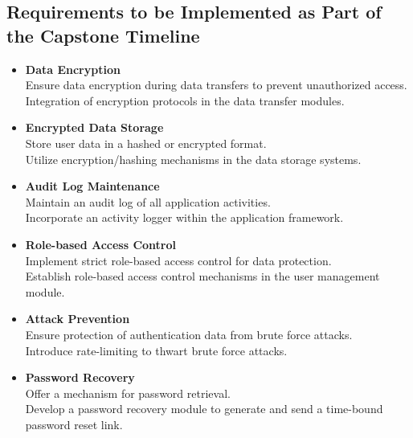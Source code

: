 \documentclass{article}
\newcounter{srnum} %
\newcommand{\rthesrnum}{SR\refstepcounter{srnum}\thesrnum:}
\begin{document}
\subsection{Requirements to be Implemented as Part of the Capstone Timeline}
\begin{itemize}[leftmargin=16.5mm,labelsep=4mm,label=\rthesrnum]
    \item \textbf{Data Encryption} \\
    Ensure data encryption during data transfers to prevent unauthorized access. \\
    Integration of encryption protocols in the data transfer modules. \\
    
    \item \textbf{Encrypted Data Storage} \\
    Store user data in a hashed or encrypted format. \\
    Utilize encryption/hashing mechanisms in the data storage systems. \\
    
    \item \textbf{Audit Log Maintenance} \\
    Maintain an audit log of all application activities. \\
    Incorporate an activity logger within the application framework. \\
    
    \item \textbf{Role-based Access Control} \\
    Implement strict role-based access control for data protection. \\
    Establish role-based access control mechanisms in the user management module. \\
    
    \item \textbf{Attack Prevention} \\
    Ensure protection of authentication data from brute force attacks. \\
    Introduce rate-limiting to thwart brute force attacks. \\
    
    \item \textbf{Password Recovery} \\
    Offer a mechanism for password retrieval. \\
    Develop a password recovery module to generate and send a time-bound password reset link. \\
\end{itemize}
\end{document}
